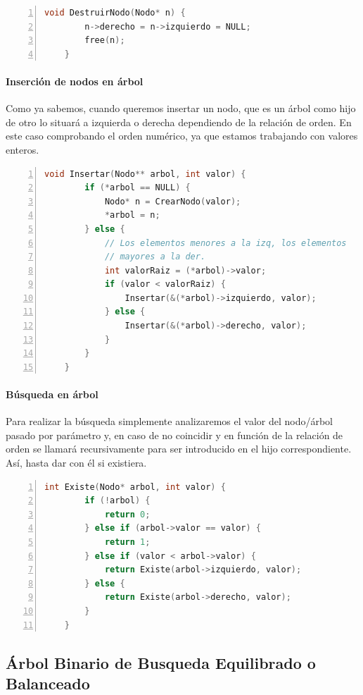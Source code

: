 \documentclass[a4paper, 11pt, titlepage]{article}
\begin{document}
            \begin{lstlisting}[language=C,numbers=left]
    void DestruirNodo(Nodo* n) {
        n->derecho = n->izquierdo = NULL;
        free(n);
    }\end{lstlisting}

            \paragraph{Inserción de nodos en árbol} Como ya sabemos, cuando queremos insertar 
            un nodo, que es un árbol como hijo de otro lo situará a izquierda o derecha 
            dependiendo de la relación de orden. En este caso comprobando el orden numérico, 
            ya que estamos trabajando con valores enteros.
            
            \begin{lstlisting}[language=C,numbers=left]
    void Insertar(Nodo** arbol, int valor) {
        if (*arbol == NULL) {
            Nodo* n = CrearNodo(valor);
            *arbol = n;
        } else {
            // Los elementos menores a la izq, los elementos
            // mayores a la der.
            int valorRaiz = (*arbol)->valor;
            if (valor < valorRaiz) {
                Insertar(&(*arbol)->izquierdo, valor);
            } else {
                Insertar(&(*arbol)->derecho, valor);
            }
        }
    }\end{lstlisting}

            \paragraph{Búsqueda en árbol} Para realizar la búsqueda simplemente analizaremos 
            el valor del nodo/árbol pasado por parámetro y, en caso de no coincidir y en 
            función de la relación de orden se llamará recursivamente para ser introducido en 
            el hijo correspondiente. Así, hasta dar con él si existiera.

            \begin{lstlisting}[language=C,numbers=left]
    int Existe(Nodo* arbol, int valor) {
        if (!arbol) {
            return 0;
        } else if (arbol->valor == valor) {
            return 1;
        } else if (valor < arbol->valor) {
            return Existe(arbol->izquierdo, valor);
        } else {
            return Existe(arbol->derecho, valor);
        }
    }\end{lstlisting}



    \subsection{Árbol Binario de Busqueda Equilibrado o Balanceado}
\end{document}
